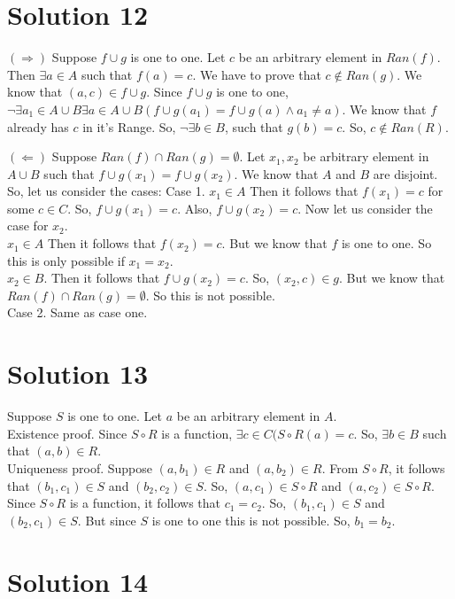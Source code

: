 \documentclass{article}
\begin{document}
\section{Solution 12}
$(\Rightarrow)$ Suppose $f \cup g$ is one to one. Let $c$ be an
arbitrary element in $Ran(f)$. Then $\exists a \in A$ such that $f(a)
= c$. We have to prove that $c \notin Ran(g)$. We know that $(a,c) \in
f \cup g$. Since $f \cup g$ is one to one, $\neg \exists a_1 \in A \cup B \exists
a \in A \cup B(f \cup g(a_1) = f \cup g(a) \land a_1 \neq a)$. We know
that $f$ already has $c$ in it's Range. So, $\neg \exists b \in B$,
such that $g(b) = c$. So, $c \notin Ran(R)$.

$(\Leftarrow)$ Suppose $Ran(f) \cap Ran(g) = \emptyset$. Let $x_1,
x_2$ be arbitrary element in $A \cup B$ such that $f \cup g(x_1) = f
\cup g(x_2)$. We know that $A$ and $B$ are disjoint. So, let us
consider the cases:
Case 1. $x_1 \in A$ Then it follows that $f(x_1) = c$ for some $c \in
C$. So, $f \cup g(x_1) = c$. Also, $f \cup g(x_2) = c$. Now let us
consider the case for $x_2$. \\
$x_1 \in A$ Then it follows that $f(x_2) = c$. But we know that $f$ is
one to one. So this is only possible if $x_1 = x_2$. \\
$x_2 \in B$. Then it follows that $f \cup g(x_2) = c$. So, $(x_2, c)
\in g$. But we know that $Ran(f) \cap Ran(g) = \emptyset$. So this is
not possible. \\
Case 2. Same as case one.

\section{Solution 13}
Suppose $S$ is one to one. Let $a$ be an arbitrary element in $A$. \\
Existence proof. Since $S \circ R$ is a function, $\exists c \in C (S
\circ R(a) = c$. So, $\exists b \in B$ such that $(a,b) \in R$. \\
Uniqueness proof. Suppose $(a,b_1) \in R$ and $(a,b_2) \in R$. From $S
\circ R$, it follows that $(b_1, c_1) \in S$ and $(b_2, c_2) \in S$.
So, $(a,c_1) \in S \circ R$ and $(a,c_2) \in S \circ R$. Since $S
\circ R$ is a function, it follows that $c_1 = c_2$. So, $(b_1, c_1)
\in S$ and $(b_2, c_1) \in S$. But since $S$ is one to one this is not
possible. So, $b_1 = b_2$.

\section{Solution 14}
\end{document}
